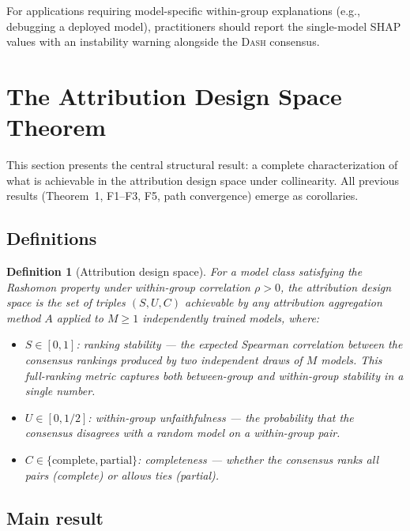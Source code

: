 \documentclass{article}
\newcommand{\DASH}{\textsc{Dash}}
\newtheorem{definition}[theorem]{Definition}
\begin{document}
For applications requiring model-specific within-group explanations
(e.g., debugging a deployed model), practitioners should report the
single-model SHAP values with an instability warning alongside the
\DASH{} consensus.


\section{The Attribution Design Space Theorem}
\label{sec:design-space-thm}

This section presents the central structural result: a complete
characterization of what is achievable in the attribution design
space under collinearity. All previous results (Theorem~1, F1--F3,
F5, path convergence) emerge as corollaries.

\subsection{Definitions}

\begin{definition}[Attribution design space]
\label{def:design-space}
For a model class satisfying the Rashomon property under within-group
correlation $\rho > 0$, the \emph{attribution design space} is the
set of triples $(S, U, C)$ achievable by any attribution aggregation
method $A$ applied to $M \geq 1$ independently trained models, where:
\begin{itemize}
    \item $S \in [0,1]$: \emph{ranking stability} ---
      the expected Spearman correlation between the consensus
      rankings produced by two independent draws of $M$ models.
      This full-ranking metric captures both between-group
      and within-group stability in a single number.
    \item $U \in [0, 1/2]$: \emph{within-group unfaithfulness} ---
      the probability that the consensus disagrees with a random
      model on a within-group pair.
    \item $C \in \{\text{complete}, \text{partial}\}$: \emph{completeness} ---
      whether the consensus ranks all pairs (complete) or allows
      ties (partial).
\end{itemize}
\end{definition}

\subsection{Main result}
\end{document}
